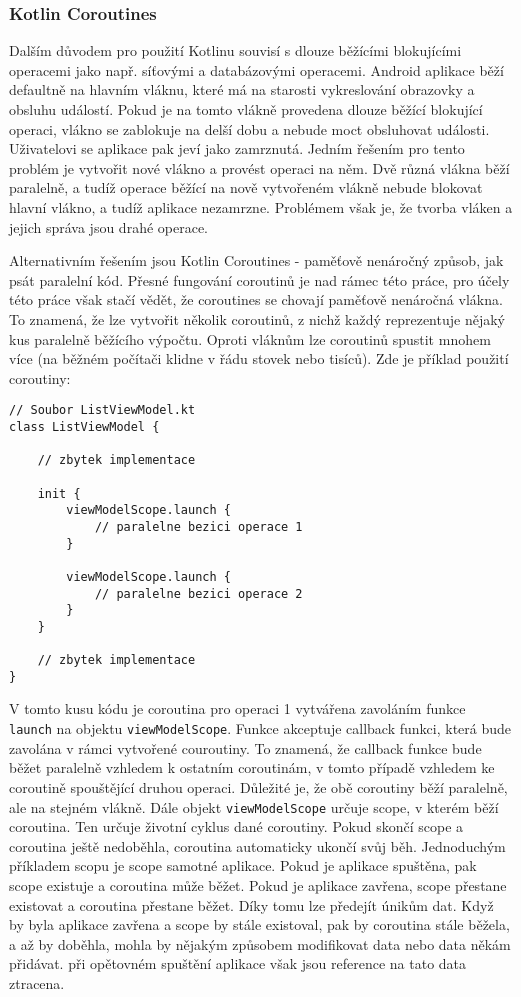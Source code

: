 \subsubsection*{Kotlin Coroutines}

\noindent Dalším důvodem pro použití Kotlinu souvisí s dlouze běžícími blokujícími operacemi jako např. síťovými a databázovými operacemi. Android aplikace běží defaultně na hlavním vláknu, které má na starosti vykreslování obrazovky a obsluhu událostí. Pokud je na tomto vlákně provedena dlouze běžící blokující operaci, vlákno se zablokuje na delší dobu a nebude moct obsluhovat události. Uživatelovi se aplikace pak jeví jako zamrznutá. Jedním řešením pro tento problém je vytvořit nové vlákno a provést operaci na něm. Dvě různá vlákna běží paralelně, a tudíž operace běžící na nově vytvořeném vlákně nebude blokovat hlavní vlákno, a tudíž aplikace nezamrzne. Problémem však je, že tvorba vláken a jejich správa jsou drahé operace. 

Alternativním řešením jsou Kotlin Coroutines - paměťově nenáročný způsob, jak psát paralelní kód. Přesné fungování coroutinů je nad rámec této práce, pro účely této práce však stačí vědět, že coroutines se chovají paměťově nenáročná vlákna. To znamená, že lze vytvořit několik coroutinů, z nichž každý reprezentuje nějaký kus paralelně běžícího výpočtu. Oproti vláknům lze coroutinů spustit mnohem více (na běžném počítači klidne v řádu stovek nebo tisíců). Zde je příklad použití coroutiny:

\begin{lstlisting}[caption={Příklad použití coroutiny}, label={lst:coroutine-example}, tabsize=2]
// Soubor ListViewModel.kt
class ListViewModel {

	// zbytek implementace

	init {
		viewModelScope.launch {
			// paralelne bezici operace 1
		}
		
		viewModelScope.launch {
			// paralelne bezici operace 2
		}
	}

	// zbytek implementace
}
\end{lstlisting}

\noindent V tomto kusu kódu je coroutina pro operaci 1 vytvářena zavoláním funkce \lstinline|launch| na objektu \lstinline|viewModelScope|. Funkce akceptuje callback funkci, která bude zavolána v rámci vytvořené couroutiny. To znamená, že callback funkce bude běžet paralelně vzhledem k ostatním  coroutinám, v tomto případě vzhledem ke coroutině spouštějící druhou operaci. Důležité je, že obě coroutiny běží paralelně, ale na stejném vlákně. Dále objekt \lstinline|viewModelScope| určuje scope, v kterém běží coroutina. Ten určuje životní cyklus dané coroutiny. Pokud skončí scope a coroutina ještě nedoběhla, coroutina automaticky ukončí svůj běh. Jednoduchým příkladem scopu je scope samotné aplikace. Pokud je aplikace spuštěna, pak scope existuje a coroutina může běžet. Pokud je aplikace zavřena, scope přestane existovat a coroutina přestane běžet. Díky tomu lze předejít únikům dat. Když by byla aplikace zavřena a scope by stále existoval, pak by coroutina stále běžela, a až by doběhla, mohla by nějakým způsobem modifikovat data nebo data někám přidávat. při opětovném spuštění aplikace však jsou reference na tato data ztracena.

